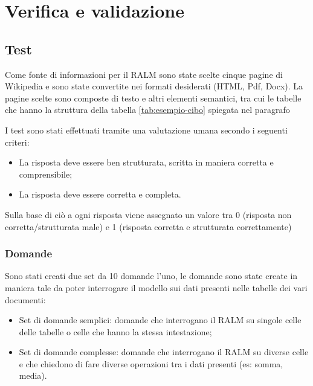 \chapter{Verifica e validazione}
\label{cap:verifica-validazione}


\section{Test}
Come fonte di informazioni per il RALM sono state scelte cinque pagine di Wikipedia e sono state convertite nei formati desiderati (HTML, Pdf, Docx).
La pagine scelte sono composte di testo e altri elementi semantici, tra cui le tabelle che hanno la struttura della tabella \ref{tab:esempio-cibo} spiegata nel paragrafo 

I test sono stati effettuati tramite una valutazione umana secondo i seguenti criteri:
\begin{itemize}
    \item La risposta deve essere ben strutturata, scritta in maniera corretta e comprensibile;
    \item La risposta deve essere corretta e completa.
\end{itemize}

Sulla base di ciò a ogni risposta viene assegnato un valore tra 0 (risposta non corretta/strutturata male) e 1 (risposta corretta e strutturata correttamente)

\subsection{Domande}
Sono stati creati due set da 10 domande l'uno, le domande sono state create in maniera tale da poter interrogare il modello sui dati presenti nelle tabelle dei vari documenti:
\begin{itemize}
    \item Set di domande semplici: domande che interrogano il RALM su singole celle delle tabelle o celle che hanno la stessa intestazione;
    \item Set di domande complesse: domande che interrogano il RALM su diverse celle e che chiedono di fare diverse operazioni tra i dati presenti (es: somma, media).
\end{itemize}

